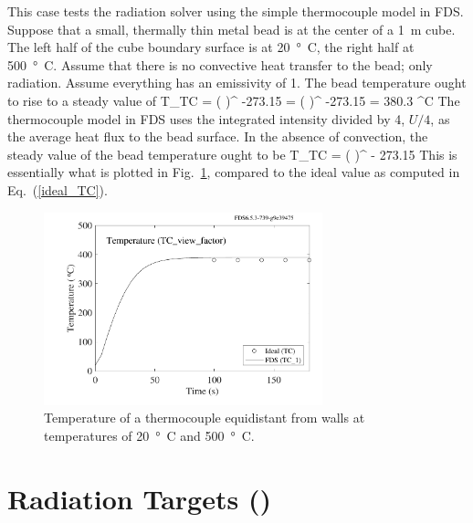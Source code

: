 \documentclass[11pt]{book}
\begin{document}
This case tests the radiation solver using the simple thermocouple model in FDS.  Suppose that a small, thermally thin metal bead is at the center of a 1~m cube. The left half of the cube boundary surface is at 20~\si{\degree C}, the right half at 500~\si{\degree C}. Assume that there is no convective heat transfer to the bead; only radiation. Assume everything has an emissivity of 1. The bead temperature ought to rise to a steady value of
\be
   T_{\hbox{\tiny TC}} = \left(  \right)^ -273.15 = \left(  \right)^ -273.15 = 380.3 \quad ^\circ \hbox{C}
   \label{ideal_TC}
\ee
The thermocouple model in FDS uses the integrated intensity divided by 4, $U/4$, as the average heat flux to the bead surface. In the absence of convection, the steady value of the bead temperature ought to be
\be
   T_{\hbox{\tiny TC}} = \left(  \right)^ - 273.15
\ee
This is essentially what is plotted in Fig.~\ref{TC_view_factor_plot}, compared to the ideal value as computed in Eq.~(\ref{ideal_TC}).
\begin{figure}[ht]
\centering
\includegraphics[height=2.2in]{SCRIPT_FIGURES/TC_view_factor}
\caption[Radiation/thermocouple test case]{Temperature of a thermocouple equidistant from walls at temperatures of 20~\si{\degree C} and 500~\si{\degree C}.}
\label{TC_view_factor_plot}
\end{figure}



\section{Radiation Targets (\texorpdfstring{}{target\_test}) }
\label{target_test}
\end{document}
